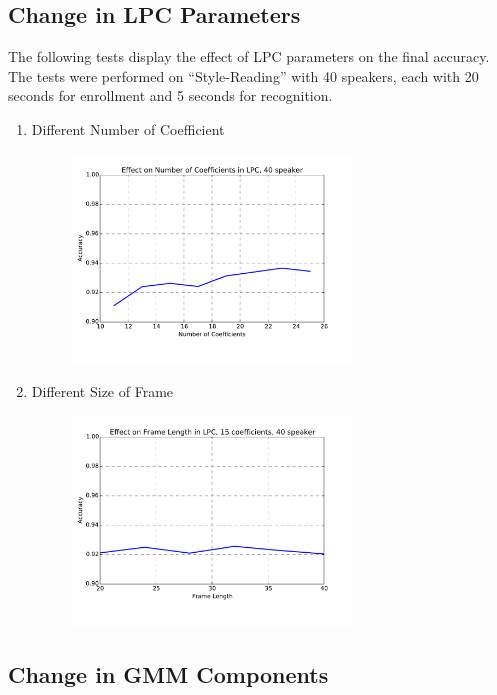 \subsection{Change in LPC Parameters}
The following tests display the effect of LPC parameters on the final accuracy.
The tests were performed on ``Style-Reading'' with 40 speakers, each with 20 seconds for enrollment
and 5 seconds for recognition.
\begin{enumerate}
  \item Different Number of Coefficient
    \begin{figure}[H]
      \centering
      \includegraphics[width=0.7\textwidth]{img/lpc-nceps.pdf}
    \end{figure}

  \item Different Size of Frame
    \begin{figure}[H]
      \centering
      \includegraphics[width=0.7\textwidth]{img/lpc-frame-len.pdf}
    \end{figure}
\end{enumerate}

\subsection{Change in GMM Components}

